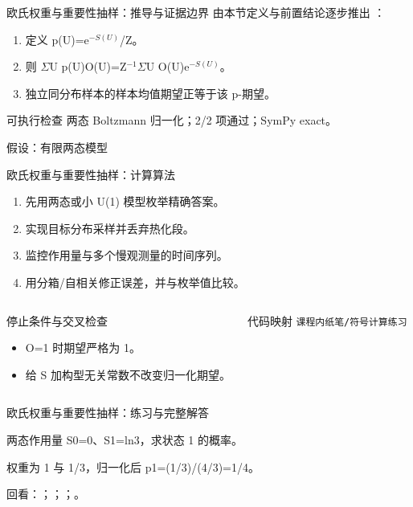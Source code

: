 \begin{frame}[t]{欧氏权重与重要性抽样：推导与证据边界}
\footnotesize
{}\quad 由本节定义与前置结论逐步推出 ：
\begin{enumerate}
\item 定义 p(U)=e\ensuremath{^{-S(U)}}/\allowbreak{}Z。
\item 则 \ensuremath{\Sigma}U p(U)O(U)=Z\ensuremath{^{-1}}\ensuremath{\Sigma}U O(U)e\ensuremath{^{-S(U)}}。
\item 独立同分布样本的样本均值期望正等于该 p-期望。
\end{enumerate}\begin{block}{可执行检查}
\quad 两态 Boltzmann 归一化；2/2 项通过；SymPy exact。
\par\scriptsize 假设：有限两态模型
\end{block}
\end{frame}

\begin{frame}[t]{欧氏权重与重要性抽样：计算算法}
\footnotesize
{}\begin{enumerate}
\item 先用两态或小 U(1) 模型枚举精确答案。
\item 实现目标分布采样并丢弃热化段。
\item 监控作用量与多个慢观测量的时间序列。
\item 用分箱/\allowbreak{}自相关修正误差，并与枚举值比较。
\end{enumerate}\begin{columns}[T,onlytextwidth]
\begin{block}{停止条件与交叉检查}\scriptsize\begin{itemize}
\item[\CheckMark] O=1 时期望严格为 1。
\item[\CheckMark] 给 S 加构型无关常数不改变归一化期望。
\end{itemize}\end{block}
\begin{block}{代码映射}
\scriptsize \texttt{课程内纸笔/\allowbreak{}符号计算练习}
\end{block}\end{columns}\end{frame}

\begin{frame}[t]{欧氏权重与重要性抽样：练习与完整解答}
\footnotesize
\begin{block}{}两态作用量 S0=0、S1=ln3，求状态 1 的概率。\end{block}
\begin{exampleblock}{}权重为 1 与 1/\allowbreak{}3，归一化后 p1=(1/\allowbreak{}3)/\allowbreak{}(4/\allowbreak{}3)=1/\allowbreak{}4。\end{exampleblock}
\vfill
\scriptsize 回看：；；；。
\end{frame}

